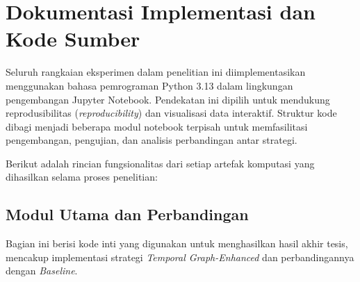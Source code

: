 \section{Dokumentasi Implementasi dan Kode Sumber}
\label{sec:dokumentasi_kode}

Seluruh rangkaian eksperimen dalam penelitian ini diimplementasikan menggunakan bahasa pemrograman Python 3.13 dalam lingkungan pengembangan Jupyter Notebook. Pendekatan ini dipilih untuk mendukung reprodusibilitas (\textit{reproducibility}) dan visualisasi data interaktif. Struktur kode dibagi menjadi beberapa modul notebook terpisah untuk memfasilitasi pengembangan, pengujian, dan analisis perbandingan antar strategi.

Berikut adalah rincian fungsionalitas dari setiap artefak komputasi yang dihasilkan selama proses penelitian:

\subsection{Modul Utama dan Perbandingan}
Bagian ini berisi kode inti yang digunakan untuk menghasilkan hasil akhir tesis, mencakup implementasi strategi \textit{Temporal Graph-Enhanced} dan perbandingannya dengan \textit{Baseline}.


